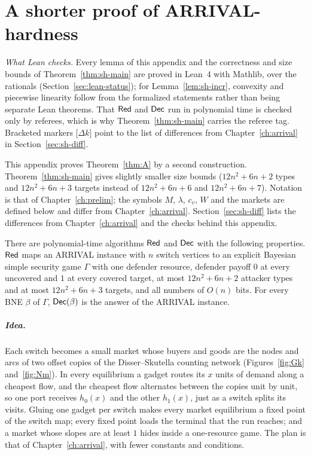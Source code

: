 \chapter{A shorter proof of ARRIVAL-hardness}\label{app:short}

\emph{What Lean checks.} Every lemma of this appendix and the correctness and size bounds of Theorem~\ref{thm:sh-main} are proved in Lean~4 with Mathlib, over the rationals (Section~\ref{sec:lean-status}); for Lemma~\ref{lem:sh-incr}, convexity and piecewise linearity follow from the formalized statements rather than being separate Lean theorems. That $\mathsf{Red}$ and $\mathsf{Dec}$ run in polynomial time is checked only by referees, which is why Theorem~\ref{thm:sh-main} carries the referee tag. Bracketed markers [$\Delta k$] point to the list of differences from Chapter~\ref{ch:arrival} in Section~\ref{sec:sh-diff}.

{\theoremstyle{plain}\newtheorem{fact}[theorem]{Fact}}

This appendix proves Theorem~\ref{thm:A} by a second construction. Theorem~\ref{thm:sh-main} gives slightly smaller size bounds
($12n^2+6n+2$ types and $12n^2+6n+3$ targets instead of $12n^2+6n+6$ and $12n^2+6n+7$). Notation is that of Chapter~\ref{ch:prelim}; the symbols $M$, $\lambda$, $c_v$, $W$ and the markets are defined below and differ from Chapter~\ref{ch:arrival}. Section~\ref{sec:sh-diff} lists the differences from Chapter~\ref{ch:arrival} and the checks behind this appendix.

\begin{theorem}\label{thm:sh-main}
\statusrefereed
There are polynomial-time algorithms $\mathsf{Red}$ and $\mathsf{Dec}$ with the following properties. $\mathsf{Red}$ maps an
ARRIVAL instance with $n$ switch vertices to an explicit Bayesian simple security game $\Gamma$ with one
defender resource, defender payoff $0$ at every uncovered and $1$ at every covered target, at most
$12n^2+6n+2$ attacker types and at most $12n^2+6n+3$ targets, and all numbers of $O(n)$ bits. For every
BNE $\beta$ of $\Gamma$, $\mathsf{Dec}(\beta)$ is the answer of the ARRIVAL instance.
\end{theorem}

\paragraph{Idea.} Each switch becomes a small market whose buyers and goods are the nodes and arcs of two offset copies of the Disser--Skutella counting network (Figures~\ref{fig:Gk} and~\ref{fig:Nm}). In every equilibrium a gadget routes its $x$ units of demand along a cheapest flow, and the cheapest flow alternates between the copies unit by unit, so one port receives $h_0(x)$ and the other $h_1(x)$, just as a switch splits its visits. Gluing one gadget per switch makes every market equilibrium a fixed point of the switch map; every fixed point loads the terminal that the run reaches; and a market whose slopes are at least $1$ hides inside a one-resource game. The plan is that of Chapter~\ref{ch:arrival}, with fewer constants and conditions.

